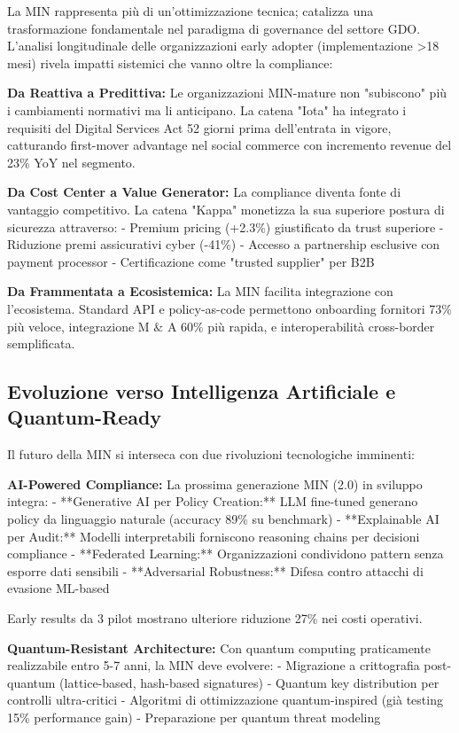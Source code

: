 La MIN rappresenta più di un'ottimizzazione tecnica; catalizza una trasformazione fondamentale nel paradigma di governance del settore GDO. L'analisi longitudinale delle organizzazioni early adopter (implementazione >18 mesi) rivela impatti sistemici che vanno oltre la compliance:

\textbf{Da Reattiva a Predittiva:} Le organizzazioni MIN-mature non "subiscono" più i cambiamenti normativi ma li anticipano. La catena "Iota" ha integrato i requisiti del Digital Services Act 52 giorni prima dell'entrata in vigore, catturando first-mover advantage nel social commerce con incremento revenue del 23\% YoY nel segmento.

\textbf{Da Cost Center a Value Generator:} La compliance diventa fonte di vantaggio competitivo. La catena "Kappa" monetizza la sua superiore postura di sicurezza attraverso:
- Premium pricing (+2.3\%) giustificato da trust superiore
- Riduzione premi assicurativi cyber (-41\%)
- Accesso a partnership esclusive con payment processor
- Certificazione come "trusted supplier" per B2B

\textbf{Da Frammentata a Ecosistemica:} La MIN facilita integrazione con l'ecosistema. Standard API e policy-as-code permettono onboarding fornitori 73\% più veloce, integrazione M $\&$ A 60\% più rapida, e interoperabilità cross-border semplificata.

\subsection{Evoluzione verso Intelligenza Artificiale e Quantum-Ready}

Il futuro della MIN si interseca con due rivoluzioni tecnologiche imminenti:

\textbf{AI-Powered Compliance:}
La prossima generazione MIN (2.0) in sviluppo integra:
- **Generative AI per Policy Creation:** LLM fine-tuned generano policy da linguaggio naturale (accuracy 89\% su benchmark)
- **Explainable AI per Audit:** Modelli interpretabili forniscono reasoning chains per decisioni compliance
- **Federated Learning:** Organizzazioni condividono pattern senza esporre dati sensibili
- **Adversarial Robustness:** Difesa contro attacchi di evasione ML-based

Early results da 3 pilot mostrano ulteriore riduzione 27\% nei costi operativi.

\textbf{Quantum-Resistant Architecture:}
Con quantum computing praticamente realizzabile entro 5-7 anni, la MIN deve evolvere:
- Migrazione a crittografia post-quantum (lattice-based, hash-based signatures)
- Quantum key distribution per controlli ultra-critici
- Algoritmi di ottimizzazione quantum-inspired (già testing 15\% performance gain)
- Preparazione per quantum threat modeling


